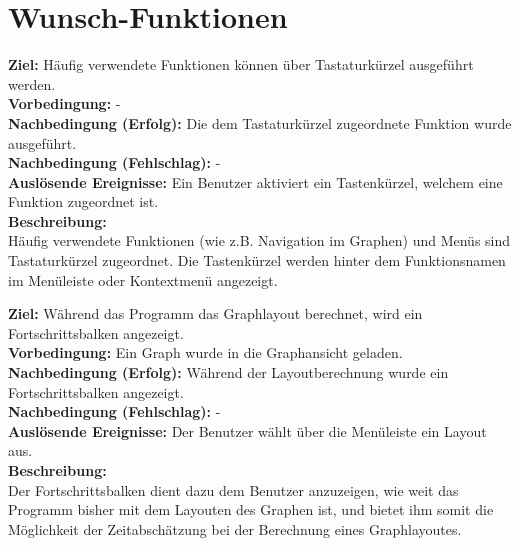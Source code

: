 \label{fa:joanatyp}
\section{Wunsch-Funktionen}

\label{fa:hotkey}
\textbf{Ziel:} Häufig verwendete Funktionen können über Tastaturkürzel ausgeführt werden.\\
\textbf{Vorbedingung:} -\\
\textbf{Nachbedingung (Erfolg):} Die dem Tastaturkürzel zugeordnete Funktion wurde ausgeführt.\\
\textbf{Nachbedingung (Fehlschlag):} -\\
\textbf{Auslösende Ereignisse:}
Ein Benutzer aktiviert ein Tastenkürzel, welchem eine Funktion zugeordnet ist.\\
\textbf{Beschreibung:}\\
Häufig verwendete Funktionen (wie z.B. Navigation im Graphen) und Menüs sind Tastaturkürzel zugeordnet.
Die Tastenkürzel werden hinter dem Funktionsnamen im Menüleiste oder Kontextmenü angezeigt.

\label{fa:fortschritt}
\textbf{Ziel:} Während das Programm das Graphlayout berechnet, wird ein Fortschrittsbalken angezeigt.\\
\textbf{Vorbedingung:} Ein Graph wurde in die Graphansicht geladen.\\
\textbf{Nachbedingung (Erfolg):} Während der Layoutberechnung wurde ein Fortschrittsbalken angezeigt.\\
\textbf{Nachbedingung (Fehlschlag):} -\\
\textbf{Auslösende Ereignisse:} Der Benutzer wählt über die Menüleiste ein Layout aus.\\
\textbf{Beschreibung:}\\
Der Fortschrittsbalken dient dazu dem Benutzer anzuzeigen, wie weit das Programm bisher mit dem Layouten des Graphen ist, und bietet ihm somit die Möglichkeit der Zeitabschätzung bei der Berechnung eines Graphlayoutes.

